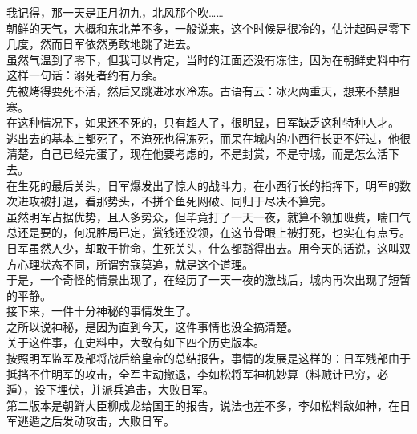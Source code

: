 \begin{multicols}{\theparacolNo}
我记得，那一天是正月初九，北风那个吹……\\

朝鲜的天气，大概和东北差不多，一般说来，这个时候是很冷的，估计起码是零下几度，然而日军依然勇敢地跳了进去。\\

虽然气温到了零下，但我可以肯定，当时的江面还没有冻住，因为在朝鲜史料中有这样一句话：溺死者约有万余。\\

先被烤得要死不活，然后又跳进冰水冷冻。古语有云：冰火两重天，想来不禁胆寒。\\

在这种情况下，如果还不死的，只有超人了，很明显，日军缺乏这种特种人才。\\

逃出去的基本上都死了，不淹死也得冻死，而呆在城内的小西行长更不好过，他很清楚，自己已经完蛋了，现在他要考虑的，不是封赏，不是守城，而是怎么活下去。\\

在生死的最后关头，日军爆发出了惊人的战斗力，在小西行长的指挥下，明军的数次进攻被打退，看那势头，不拼个鱼死网破、同归于尽决不算完。\\

虽然明军占据优势，且人多势众，但毕竟打了一天一夜，就算不领加班费，喘口气总还是要的，何况胜局已定，赏钱还没领，在这节骨眼上被打死，也实在有点亏。\\

日军虽然人少，却敢于拚命，生死关头，什么都豁得出去。用今天的话说，这叫双方心理状态不同，所谓穷寇莫追，就是这个道理。\\

于是，一个奇怪的情景出现了，在经历了一天一夜的激战后，城内再次出现了短暂的平静。\\

接下来，一件十分神秘的事情发生了。\\

之所以说神秘，是因为直到今天，这件事情也没全搞清楚。\\

关于这件事，在史料中，大致有如下四个历史版本。\\

按照明军监军及部将战后给皇帝的总结报告，事情的发展是这样的：日军残部由于抵挡不住明军的攻击，全军主动撤退，李如松将军神机妙算（料贼计已穷，必遁），设下埋伏，并派兵追击，大败日军。\\

第二版本是朝鲜大臣柳成龙给国王的报告，说法也差不多，李如松料敌如神，在日军逃遁之后发动攻击，大败日军。\\


\end{multicols}
